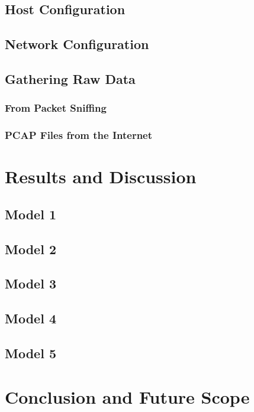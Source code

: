 \documentclass[12pt]{article}
\theoremstyle{definition}
\begin{document}
		\subsection{Host Configuration}
		\lipsum[1-2]
		\subsection{Network Configuration}
		\lipsum[1-3]
		\subsection{Gathering Raw Data}
		\lipsum[1]
			\subsubsection{From Packet Sniffing}
			\lipsum[1-2]
			\subsubsection{PCAP Files from the Internet \cite{Chianese2017}}
			\lipsum[1-2]
	
	\cleardoublepage
	\section{Results and Discussion}
	\lipsum[1]
		\subsection{Model 1}
		\lipsum[1-3]
		\subsection{Model 2}
		\lipsum[1-3]
		\subsection{Model 3}
		\lipsum[1-3]
		\subsection{Model 4}
		\lipsum[1-3]
		\subsection{Model 5}
		\lipsum[1-3]	

	\cleardoublepage
	\section{Conclusion and Future Scope \cite{AlEroud2017}}
	\lipsum[1-4]
	
	\cleardoublepage
	
	
		
	
	
	
	
	
	
	
	
	
	
	
	
	
	
	
	
	
	
	
	
	
\end{document}
